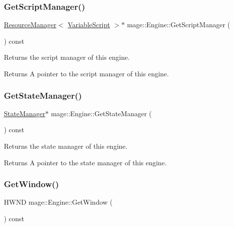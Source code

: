 \subsubsection{\texorpdfstring{Get\+Script\+Manager()}{GetScriptManager()}}
{\footnotesize\ttfamily \hyperlink{classmage_1_1_resource_manager}{Resource\+Manager}$<$ \hyperlink{classmage_1_1_variable_script}{Variable\+Script} $>$$\ast$ mage\+::\+Engine\+::\+Get\+Script\+Manager (\begin{DoxyParamCaption}{ }\end{DoxyParamCaption}) const}

Returns the script manager of this engine.

\begin{DoxyReturn}{Returns}
A pointer to the script manager of this engine. 
\end{DoxyReturn}
\hypertarget{classmage_1_1_engine_a4f35bccc3784de531245a2549d537745}{}\label{classmage_1_1_engine_a4f35bccc3784de531245a2549d537745} 
\subsubsection{\texorpdfstring{Get\+State\+Manager()}{GetStateManager()}}
{\footnotesize\ttfamily \hyperlink{classmage_1_1_state_manager}{State\+Manager}$\ast$ mage\+::\+Engine\+::\+Get\+State\+Manager (\begin{DoxyParamCaption}{ }\end{DoxyParamCaption}) const}

Returns the state manager of this engine.

\begin{DoxyReturn}{Returns}
A pointer to the state manager of this engine. 
\end{DoxyReturn}
\hypertarget{classmage_1_1_engine_a1c5f9d8c68045b36f404251359aa41e4}{}\label{classmage_1_1_engine_a1c5f9d8c68045b36f404251359aa41e4} 
\subsubsection{\texorpdfstring{Get\+Window()}{GetWindow()}}
{\footnotesize\ttfamily H\+W\+ND mage\+::\+Engine\+::\+Get\+Window (\begin{DoxyParamCaption}{ }\end{DoxyParamCaption}) const}

